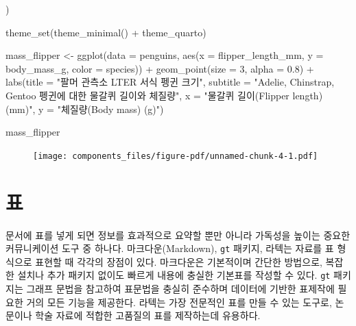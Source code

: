 \documentclass[
  letterpaper,
]{book}
\newenvironment{Shaded}{\begin{snugshade}}{\end{snugshade}}
\newcommand{\AttributeTok}[1]{\textcolor[rgb]{0.40,0.45,0.13}{#1}}
\newcommand{\DecValTok}[1]{\textcolor[rgb]{0.68,0.00,0.00}{#1}}
\newcommand{\FloatTok}[1]{\textcolor[rgb]{0.68,0.00,0.00}{#1}}
\newcommand{\FunctionTok}[1]{\textcolor[rgb]{0.28,0.35,0.67}{#1}}
\newcommand{\NormalTok}[1]{\textcolor[rgb]{0.00,0.23,0.31}{#1}}
\newcommand{\OtherTok}[1]{\textcolor[rgb]{0.00,0.23,0.31}{#1}}
\newcommand{\SpecialCharTok}[1]{\textcolor[rgb]{0.37,0.37,0.37}{#1}}
\newcommand{\StringTok}[1]{\textcolor[rgb]{0.13,0.47,0.30}{#1}}
\begin{document}
\begin{Shaded}
\begin{Highlighting}[]
\NormalTok{)}

\FunctionTok{theme\_set}\NormalTok{(}\FunctionTok{theme\_minimal}\NormalTok{() }\SpecialCharTok{+}\NormalTok{ theme\_quarto)}

\NormalTok{mass\_flipper }\OtherTok{\textless{}{-}} \FunctionTok{ggplot}\NormalTok{(}\AttributeTok{data =}\NormalTok{ penguins,}
                       \FunctionTok{aes}\NormalTok{(}\AttributeTok{x =}\NormalTok{ flipper\_length\_mm,}
                           \AttributeTok{y =}\NormalTok{ body\_mass\_g,}
                           \AttributeTok{color =}\NormalTok{ species)) }\SpecialCharTok{+}
  \FunctionTok{geom\_point}\NormalTok{(}\AttributeTok{size =} \DecValTok{3}\NormalTok{,}
             \AttributeTok{alpha =} \FloatTok{0.8}\NormalTok{) }\SpecialCharTok{+}
  \FunctionTok{labs}\NormalTok{(}\AttributeTok{title =} \StringTok{"팔머 관측소 LTER 서식 펭귄 크기"}\NormalTok{,}
       \AttributeTok{subtitle =} \StringTok{"Adelie, Chinstrap, Gentoo 펭귄에 대한 물갈퀴 길이와 체질량"}\NormalTok{,}
       \AttributeTok{x =} \StringTok{"물갈퀴 길이(Flipper length) (mm)"}\NormalTok{,}
       \AttributeTok{y =} \StringTok{"체질량(Body mass) (g)"}\NormalTok{)}

\NormalTok{mass\_flipper}
\end{Highlighting}
\end{Shaded}

\begin{figure}[H]

{\centering \texttt{[image: components\_files/figure-pdf/unnamed-chunk-4-1.pdf]}

}

\end{figure}

\hypertarget{uxd45c-1}{%
\section{표}\label{uxd45c-1}}

문서에 표를 넣게 되면 정보를 효과적으로 요약할 뿐만 아니라 가독성을
높이는 중요한 커뮤니케이션 도구 중 하나다. 마크다운(Markdown),
\texttt{gt} 패키지, 라텍는 자료를 표 형식으로 표현할 때 각각의 장점이
있다. 마크다운은 기본적이며 간단한 방법으로, 복잡한 설치나 추가 패키지
없이도 빠르게 내용에 충실한 기본표를 작성할 수 있다. \texttt{gt}
패키지는 그래프 문법을 참고하여 표문법을 충실히 준수하며 데이터에 기반한
표제작에 필요한 거의 모든 기능을 제공한다. 라텍는 가장 전문적인 표를
만들 수 있는 도구로, 논문이나 학술 자료에 적합한 고품질의 표를
제작하는데 유용하다.
\end{document}
